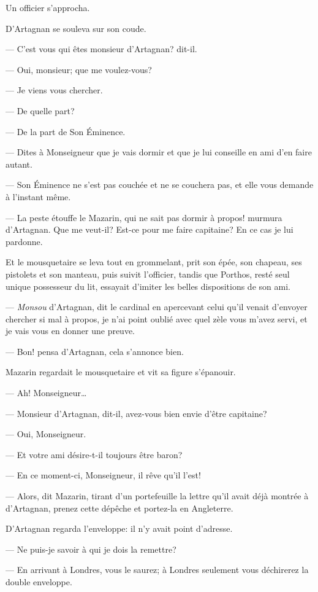 Un officier s'approcha.

D'Artagnan se souleva sur son coude.

— C'est vous qui êtes monsieur d'Artagnan? dit-il.

— Oui, monsieur; que me voulez-vous?

— Je viens vous chercher.

— De quelle part?

— De la part de Son Éminence.

— Dites à Monseigneur que je vais dormir et que je lui conseille en ami d'en faire autant.

— Son Éminence ne s'est pas couchée et ne se couchera pas, et elle vous demande à l'instant même.

— La peste étouffe le Mazarin, qui ne sait pas dormir à propos! murmura d'Artagnan. Que me veut-il? Est-ce pour me faire capitaine? En ce cas je lui pardonne.

Et le mousquetaire se leva tout en grommelant, prit son épée, son chapeau, ses pistolets et son manteau, puis suivit l'officier, tandis que Porthos, resté seul unique possesseur du lit, essayait d'imiter les belles dispositions de son ami.

— \textit{Monsou} d'Artagnan, dit le cardinal en apercevant celui qu'il venait d'envoyer chercher si mal à propos, je n'ai point oublié avec quel zèle vous m'avez servi, et je vais vous en donner une preuve.

— Bon! pensa d'Artagnan, cela s'annonce bien.

Mazarin regardait le mousquetaire et vit sa figure s'épanouir.

— Ah! Monseigneur\dots

— Monsieur d'Artagnan, dit-il, avez-vous bien envie d'être capitaine?

— Oui, Monseigneur.

— Et votre ami désire-t-il toujours être baron?

— En ce moment-ci, Monseigneur, il rêve qu'il l'est!

— Alors, dit Mazarin, tirant d'un portefeuille la lettre qu'il avait déjà montrée à d'Artagnan, prenez cette dépêche et portez-la en Angleterre.

D'Artagnan regarda l'enveloppe: il n'y avait point d'adresse.

— Ne puis-je savoir à qui je dois la remettre?

— En arrivant à Londres, vous le saurez; à Londres seulement vous déchirerez la double enveloppe.

